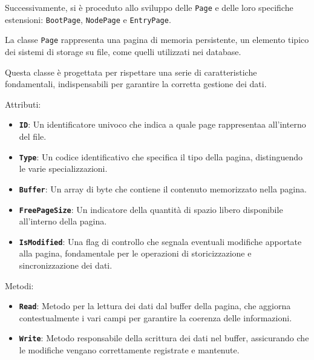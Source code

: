 \documentclass[12pt,a4paper,openright,twoside]{book}
\begin{document}
                Successivamente, si è proceduto allo sviluppo delle \texttt{Page} e delle loro specifiche estensioni: \texttt{BootPage}, \texttt{NodePage} e \texttt{EntryPage}.

                

                La classe \texttt{Page} rappresenta una pagina di memoria persistente, un elemento tipico dei sistemi di storage su file, come quelli utilizzati nei database.

                Questa classe è progettata per rispettare una serie di caratteristiche fondamentali, indispensabili per garantire la corretta gestione dei dati.

                Attributi:
                \begin{itemize}
                    \item \textbf{\texttt{ID}}: Un identificatore univoco che indica a quale page rappresentaa all'interno del file.
                    \item \textbf{\texttt{Type}}: Un codice identificativo che specifica il tipo della pagina, distinguendo le varie specializzazioni.
                    \item \textbf{\texttt{Buffer}}: Un array di byte che contiene il contenuto memorizzato nella pagina.
                    \item \textbf{\texttt{FreePageSize}}: Un indicatore della quantità di spazio libero disponibile all'interno della pagina.
                    \item \textbf{\texttt{IsModified}}: Una flag di controllo che segnala eventuali modifiche apportate alla pagina, fondamentale per le operazioni di storicizzazione e sincronizzazione dei dati.
                \end{itemize}

                Metodi:
                \begin{itemize}
                    \item \textbf{\texttt{Read}}: Metodo per la lettura dei dati dal buffer della pagina, che aggiorna contestualmente i vari campi per garantire la coerenza delle informazioni.
                    \item \textbf{\texttt{Write}}: Metodo responsabile della scrittura dei dati nel buffer, assicurando che le modifiche vengano correttamente registrate e mantenute.
                \end{itemize}
\end{document}

